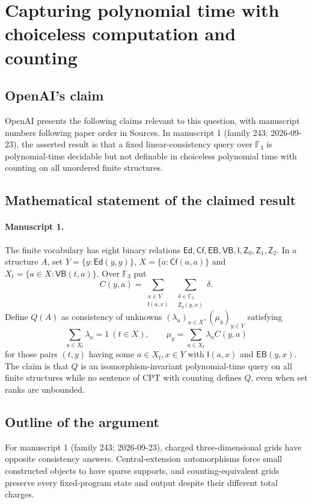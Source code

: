 \documentclass[11pt]{article}
\begin{document}
\section*{Capturing polynomial time with choiceless computation and counting}

\subsection{OpenAI's claim}
OpenAI presents the following claims relevant to this question, with manuscript numbers following paper order in Sources. In manuscript 1 (family 243; 2026-09-23), the asserted result is that a fixed linear-consistency query over $\mathbb F_3$ is polynomial-time decidable but not definable in choiceless polynomial time with counting on all unordered finite structures.

\subsection{Mathematical statement of the claimed result}
\paragraph{Manuscript 1.}
The finite vocabulary has eight binary relations $\mathsf{Ed},\mathsf{Cf},\mathsf{EB},\mathsf{VB},\mathsf I,\mathsf Z_0,\mathsf Z_1,\mathsf Z_2$. In a structure $A$, set $Y=\{y:\mathsf{Ed}(y,y)\}$, $X=\{a:\mathsf{Cf}(a,a)\}$ and $X_t=\{a\in X:\mathsf{VB}(t,a)\}$. Over $\mathbb F_3$ put
\[
 C(y,a)=\sum_{\substack{x\in Y\\\mathsf I(a,x)}}\ \sum_{\substack{\delta\in\mathbb F_3\\\mathsf Z_{\delta}(y,x)}}\delta.
\]
Define $Q(A)$ as consistency of unknowns $(\lambda_a)_{a\in X},(\mu_y)_{y\in Y}$ satisfying
\[
 \sum_{a\in X_t}\lambda_a=1\ (t\in X),\qquad
 \mu_y=\sum_{a\in X_t}\lambda_a C(y,a)
\]
for those pairs $(t,y)$ having some $a\in X_t,x\in Y$ with $\mathsf I(a,x)$ and $\mathsf{EB}(y,x)$. The claim is that $Q$ is an isomorphism-invariant polynomial-time query on all finite structures while no sentence of CPT with counting defines $Q$, even when set ranks are unbounded.

\subsection{Outline of the argument}
For manuscript 1 (family 243; 2026-09-23), charged three-dimensional grids have opposite consistency answers. Central-extension automorphisms force small constructed objects to have sparse supports, and counting-equivalent grids preserve every fixed-program state and output despite their different total charges.
\end{document}
